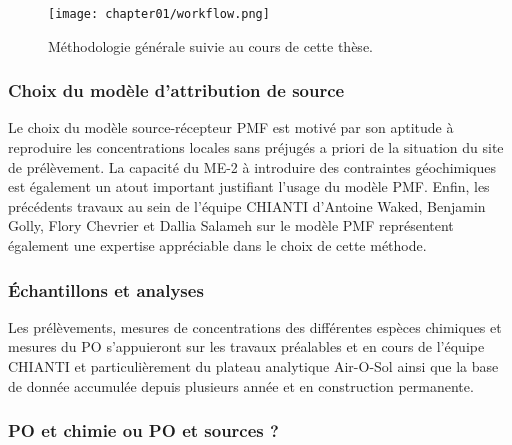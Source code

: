 \begin{figure}[ht]
    \centering
    \texttt{[image: chapter01/workflow.png]}
    \caption{Méthodologie générale suivie au cours de cette thèse.}%
    \label{fig:chapter01/workflow}
\end{figure}


\subsubsection{Choix du modèle d'attribution de source}%
\label{ssub:choix_du_modèle_d_attribution_de_source}

Le choix du modèle source-récepteur PMF est motivé par son aptitude à reproduire les
concentrations locales sans préjugés a priori de la situation du site de prélèvement. La
capacité du ME-2 à introduire des contraintes géochimiques est également un atout
important justifiant l'usage du modèle PMF.
Enfin, les précédents travaux au sein de l'équipe CHIANTI d'Antoine Waked, Benjamin Golly,
Flory Chevrier et Dallia Salameh sur le modèle PMF représentent également une expertise
appréciable dans le choix de cette méthode.

\subsubsection{Échantillons et analyses}%
\label{ssub:échantillons_et_analyses}

Les prélèvements, mesures de concentrations des différentes espèces chimiques et
mesures du PO s'appuieront sur les travaux préalables et en cours de l'équipe CHIANTI et
particulièrement du plateau analytique Air-O-Sol ainsi que la base de donnée accumulée
depuis plusieurs année et en construction permanente.

\subsubsection{PO et chimie ou PO et sources ?}%
\label{ssub:chimie_ou_sources_}


